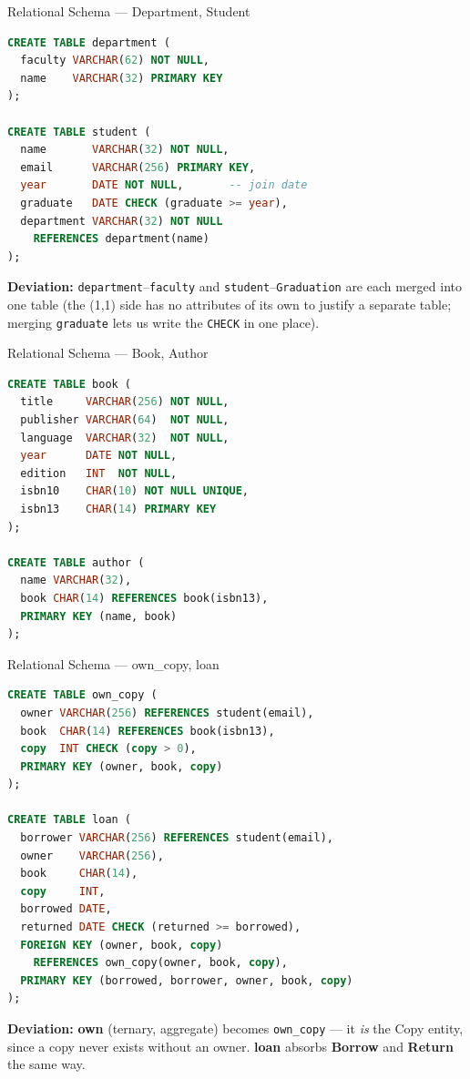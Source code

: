 \documentclass{beamer}
\begin{document}
\begin{frame}[fragile]{Relational Schema --- Department, Student}
\begin{lstlisting}[language=SQL]
CREATE TABLE department (
  faculty VARCHAR(62) NOT NULL,
  name    VARCHAR(32) PRIMARY KEY
);

CREATE TABLE student (
  name       VARCHAR(32) NOT NULL,
  email      VARCHAR(256) PRIMARY KEY,
  year       DATE NOT NULL,       -- join date
  graduate   DATE CHECK (graduate >= year),
  department VARCHAR(32) NOT NULL
    REFERENCES department(name)
);
\end{lstlisting}
\textbf{Deviation:} \texttt{department}--\texttt{faculty} and \texttt{student}--\texttt{Graduation} are each merged into one table (the (1,1) side has no attributes of its own to justify a separate table; merging \texttt{graduate} lets us write the \texttt{CHECK} in one place).
\end{frame}

\begin{frame}[fragile]{Relational Schema --- Book, Author}
\begin{lstlisting}[language=SQL]
CREATE TABLE book (
  title     VARCHAR(256) NOT NULL,
  publisher VARCHAR(64)  NOT NULL,
  language  VARCHAR(32)  NOT NULL,
  year      DATE NOT NULL,
  edition   INT  NOT NULL,
  isbn10    CHAR(10) NOT NULL UNIQUE,
  isbn13    CHAR(14) PRIMARY KEY
);

CREATE TABLE author (
  name VARCHAR(32),
  book CHAR(14) REFERENCES book(isbn13),
  PRIMARY KEY (name, book)
);
\end{lstlisting}
\end{frame}

\begin{frame}[fragile]{Relational Schema --- own\_copy, loan}
\begin{lstlisting}[language=SQL]
CREATE TABLE own_copy (
  owner VARCHAR(256) REFERENCES student(email),
  book  CHAR(14) REFERENCES book(isbn13),
  copy  INT CHECK (copy > 0),
  PRIMARY KEY (owner, book, copy)
);

CREATE TABLE loan (
  borrower VARCHAR(256) REFERENCES student(email),
  owner    VARCHAR(256),
  book     CHAR(14),
  copy     INT,
  borrowed DATE,
  returned DATE CHECK (returned >= borrowed),
  FOREIGN KEY (owner, book, copy)
    REFERENCES own_copy(owner, book, copy),
  PRIMARY KEY (borrowed, borrower, owner, book, copy)
);
\end{lstlisting}
\textbf{Deviation:} \textbf{own} (ternary, aggregate) becomes \texttt{own\_copy} --- it \emph{is} the Copy entity, since a copy never exists without an owner. \textbf{loan} absorbs \textbf{Borrow} and \textbf{Return} the same way.
\end{frame}
\end{document}
